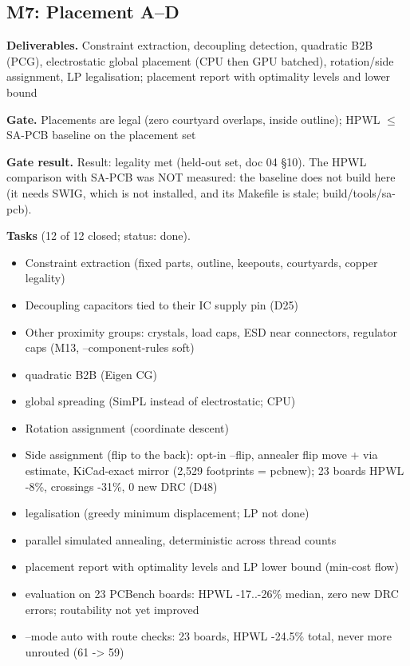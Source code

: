 \subsection*{M7: Placement A--D}
\noindent\textbf{Deliverables.} Constraint extraction, decoupling detection, quadratic B2B (PCG), electrostatic global placement (CPU then GPU batched), rotation/side assignment, LP legalisation; placement report with optimality levels and lower bound\par\smallskip
\noindent\textbf{Gate.} Placements are legal (zero courtyard overlaps, inside outline); HPWL $\leq$ SA-PCB baseline on the placement set\par\smallskip
\noindent\colorbox{boxfill}{\parbox{\dimexpr\linewidth-2\fboxsep}{\textbf{Gate result.} Result: legality met (held-out set, doc 04 \S10). The HPWL comparison with SA-PCB was NOT measured: the baseline does not build here (it needs SWIG, which is not installed, and its Makefile is stale; build/tools/sa-pcb).}}\par\smallskip
\noindent\textbf{Tasks} (12 of 12 closed; status: done).
\begin{itemize}[leftmargin=1.6em,itemsep=1pt]
\item[\textcolor{fraqua}{$\checkmark$}] Constraint extraction (fixed parts, outline, keepouts, courtyards, copper legality)
\item[\textcolor{fraqua}{$\checkmark$}] Decoupling capacitors tied to their IC supply pin (D25)
\item[\textcolor{fraqua}{$\checkmark$}] Other proximity groups: crystals, load caps, ESD near connectors, regulator caps (M13, --component-rules soft)
\item[\textcolor{fraqua}{$\checkmark$}] quadratic B2B (Eigen CG)
\item[\textcolor{fraqua}{$\checkmark$}] global spreading (SimPL instead of electrostatic; CPU)
\item[\textcolor{fraqua}{$\checkmark$}] Rotation assignment (coordinate descent)
\item[\textcolor{fraqua}{$\checkmark$}] Side assignment (flip to the back): opt-in --flip, annealer flip move + via estimate, KiCad-exact mirror (2,529 footprints = pcbnew); 23 boards HPWL -8\%, crossings -31\%, 0 new DRC (D48)
\item[\textcolor{fraqua}{$\checkmark$}] legalisation (greedy minimum displacement; LP not done)
\item[\textcolor{fraqua}{$\checkmark$}] parallel simulated annealing, deterministic across thread counts
\item[\textcolor{fraqua}{$\checkmark$}] placement report with optimality levels and LP lower bound (min-cost flow)
\item[\textcolor{fraqua}{$\checkmark$}] evaluation on 23 PCBench boards: HPWL -17..-26\% median, zero new DRC errors; routability not yet improved
\item[\textcolor{fraqua}{$\checkmark$}] --mode auto with route checks: 23 boards, HPWL -24.5\% total, never more unrouted (61 -\textgreater{} 59)
\end{itemize}
